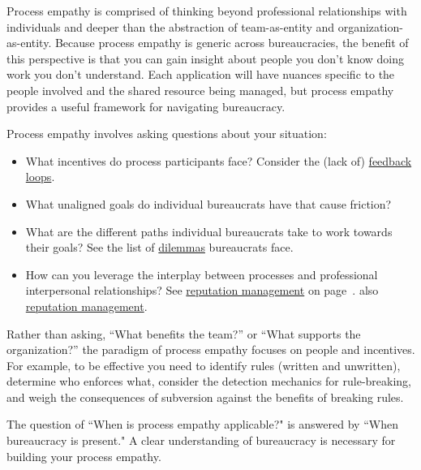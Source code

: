 Process empathy is comprised of thinking beyond professional relationships with individuals and deeper than the abstraction of team-as-entity and organization-as-entity. 
Because process empathy is generic across bureaucracies, the benefit of this perspective is that you can gain insight about people you don't know doing work you don't understand.
Each application will have nuances specific to the people involved and the shared resource being managed, but process empathy provides a useful framework for navigating bureaucracy.


Process empathy involves asking questions about your situation:
\begin{itemize}
    \item What incentives do process participants face?
Consider the (lack of) \hyperref[sec:feedback-loop-and-ripples]{feedback loops}.
    \item What unaligned goals do individual bureaucrats have that cause friction?
    \item What are the different paths individual bureaucrats take to work towards their goals?
See the list of \hyperref[sec:dilemma-trilemma]{dilemmas} bureaucrats face.
    \item How can you leverage the interplay between processes and  professional interpersonal relationships?
See 
\ifhaspagenumbers
\hyperref[sec:reputation]{reputation management} on page~\pageref{sec:reputation}.
\else
also \hyperref[sec:reputation]{reputation management}.
\fi

\end{itemize}

Rather than asking, ``What benefits the team?'' or ``What supports the organization?'' the paradigm of process empathy focuses on people and incentives. %
For example, to be effective you need to 
identify rules (written and unwritten), determine who enforces what, consider the detection mechanics for rule-breaking, and weigh the consequences of subversion against the benefits of breaking rules.


The question of ``When is process empathy applicable?" is answered by ``When bureaucracy is present." A clear understanding of bureaucracy is necessary for building your process empathy.

